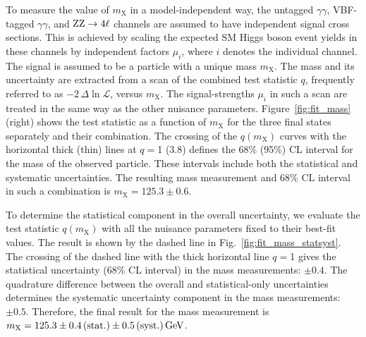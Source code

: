 \documentclass[12pt,twoside,a4paper,cmspaper,final,collab]{cms-tdr}
\begin{document}
To measure the value of $m_{\mathrm{X}}$ in a model-independent way,
the untagged $\gamma\gamma$, VBF-tagged $\gamma\gamma$, and $\mathrm{Z}\mathrm{Z} \to 4\ell$
channels are assumed to have independent signal cross sections.
This is achieved by scaling the expected SM Higgs boson event yields
in these channels by independent factors $\mu_i$,
where $i$ denotes the individual channel.
The signal is assumed to be a particle with a unique mass $m_{\mathrm{X}}$.
The mass and its uncertainty are extracted from a scan of the combined
test statistic $q$, frequently referred to as $-2 \, \Delta \ln \mathcal{L}$, versus $m_{\mathrm{X}}$.
The signal-strengths $\mu_i$ in such a scan are treated in the same way as the other nuisance parameters.
Figure~\ref{fig:fit_mass} (right) shows the test statistic
as a function of $m_{\mathrm{X}}$ for the three final states separately and their combination.
The crossing of the $q(m_{\mathrm{X}})$ curves with the horizontal thick (thin) lines at $q=$1 (3.8) defines
the 68\% (95\%) CL interval for the mass of the observed particle. These intervals include
both the statistical and systematic uncertainties.
The resulting mass measurement and 68\% CL interval in such a combination is $m_{\mathrm{X}} = 125.3 \pm 0.6$\GeV.

To determine the statistical component in the overall uncertainty, we evaluate
the test statistic $q(m_{\mathrm{X}})$ with all the nuisance parameters fixed to their best-fit values.
The result is shown by the dashed line in Fig.~\ref{fig:fit_mass_statsyst}.
The crossing of the dashed line with the thick horizontal line
$q=$1 gives the statistical uncertainty
(68\% CL interval) in the
mass measurements: $\pm 0.4$\GeV. The quadrature difference
between the overall and statistical-only uncertainties determines
the systematic uncertainty component in the mass measurements: ${\pm}0.5$\GeV.
Therefore, the final result for the mass measurement is $m_{\mathrm{X}}= 125.3 \pm 0.4\,\text{(stat.)}\pm 0.5\,\text{(syst.)}\,\text{Ge\hspace{-.08em}V}$.
\end{document}
